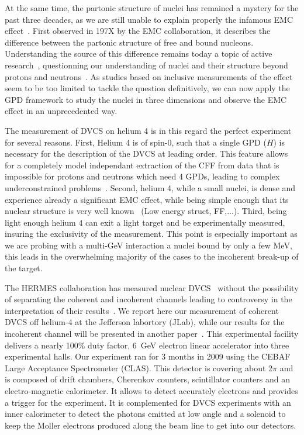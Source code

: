 \documentclass[%
 reprint,
 amsmath,amssymb,
 aps,
]{revtex4-1}
\begin{document}
At the same time, the partonic structure of nuclei has remained a mystery
for the past three decades, as we are still unable to explain properly the 
infamous EMC effect~\cite{}. First observed in 197X by the EMC 
collaboration, it describes the difference between the partonic structure of
free and bound nucleons. Understanding the source of this difference remains 
today a topic of active research~\cite{},
questionning our understanding of nuclei and their structure beyond protons
and neutrons~\cite{}. As studies based on inclusive measurements of the
effect seem to be too limited to tackle the question definitively, we can now
apply the GPD framework to study the nuclei in three dimensions and observe
the EMC effect in an unprecedented way.

The measurement of DVCS on helium 4 is in this regard the perfect experiment for
several reasons. First, Helium 4 is of spin-0, such that a single GPD ($H$) is
necessary for the description of the DVCS at leading order. This feature allows for a
completely model independant extraction of the CFF from data that is impossible for 
protons and neutrons which need 4 GPDs, leading to complex underconstrained 
problems~\cite{}. Second, helium 4, while a small nuclei, is dense and experience 
already a significant EMC effect, while being simple enough that its nuclear
structure is very well known~\cite{} (Low energy struct, FF,...). Third, being 
light enough helium 4 can exit
a light target and be experimentally measured, insuring the exclusivity of the 
measurement. This point is especially important as we are probing with a 
multi-GeV interaction a nuclei bound by only a few MeV, this leads in the 
overwhelming majority of the cases to the incoherent break-up of the target.

The HERMES collaboration has measured nuclear DVCS~\cite{} without the 
possibility of separating the coherent and incoherent channels leading
to controversy in the interpretation of their results~\cite{}. We report
here our measurement of coherent DVCS off helium-4 at the Jefferson labortory
(JLab), while our results for the incoherent channel will be presented in
another paper~\cite{}. This experimental facility delivers a nearly 100\% duty factor, 6~GeV 
electron linear accelerator into three experimental halls. Our experiment
ran for 3 months in 2009 using the CEBAF Large Acceptance Spectrometer (CLAS).
This detector is covering about 2$\pi$ and is composed of drift chambers, Cherenkov counters, scintillator 
counters and an electro-magnetic calorimeter. It allows to detect accurately
electrons and provides a trigger for the experiment. It is complemented for DVCS experiments with
an inner calorimeter to detect the photons emitted at low angle and a solenoid
to keep the Moller electrons produced along the beam line to get into our detectors.
\end{document}

